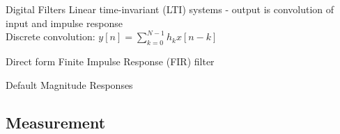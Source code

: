 \documentclass{beamer}
\begin{document}
\begin{frame}{Digital Filters}
  Linear time-invariant (LTI) systems - output is convolution of input and impulse
  response \\
  \vspace{0.5cm}
  Discrete convolution: $y[n]=\sum_{k=0}^{N-1}h_k x[n-k]$ \\
  \begin{figure}[!hpbt]
    \centering 
    
  \end{figure}
  \begin{center}
    Direct form Finite Impulse Response (FIR) filter
  \end{center}
\end{frame}

\begin{frame}{Default Magnitude Responses}
  \begin{figure}[!hpbt]
    \subfloat[Smoother]{%
       
    }
    \subfloat[Differentiator]{
      
    }
  \end{figure}
\end{frame}

\subsection{Measurement}

\bpLittleEndian
\bpNumberBitsAbove
\bpSetTickHeight{1pt}
\bpSetBitWidth{8pt}
\renewcommand\bpFormatBitNumber[1]{{\Tiny\ttfamily\strut#1}}
\renewcommand\bpFormatField[1]{{\tiny\ttfamily\strut#1}}

\newcommand{\colorbitbox}[3]{%
  \rlap{\bitbox{#2}{\color{#1}\rule{\width}{\height}}}%
  \bitbox{#2}{#3}}

\end{document}

